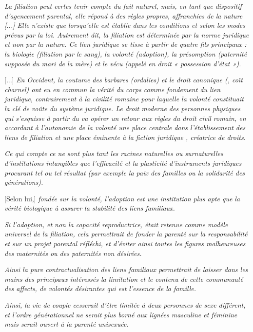 \begin{displayquote}

\emph{La filiation peut certes tenir compte du fait naturel, mais, en tant que dispositif d'agencement parental, elle répond à des règles propres, affranchies de la nature \emph{[...]} Elle n'existe que lorsqu'elle est établie dans les conditions et selon les modes prévus par la loi. Autrement dit, la filiation est déterminée par la norme juridique et non par la nature. Ce lien juridique se tisse à partir de quatre fils principaux : la biologie (filiation par le sang), la volonté (adoption), la présomption (paternité supposée du mari de la mère) et le vécu (appelé en droit « possession d'état »).}

[...] \emph{En Occident, la coutume des barbares (ordalies) et le droit canonique (, coït charnel) ont eu en commun la vérité du corps comme fondement du lien juridique, contrairement à la civilité romaine pour laquelle la volonté constituait la clé de voûte du système juridique. Le droit moderne des personnes physiques qui s'esquisse à partir du  va opérer un retour aux règles du droit civil romain, en accordant à l'autonomie de la volonté une place centrale dans l'établissement des liens de filiation et une place éminente à la fiction juridique , créatrice de droits.}
 
\emph{Ce qui compte ce ne sont plus tant les racines naturelles ou surnaturelles d'institutions intangibles que l'efficacité et la plasticité d'instruments juridiques procurant tel ou tel résultat (par exemple la paix des familles ou la solidarité des générations).}
 
 [Selon lui,] \emph{fondée sur la volonté, l'adoption est une institution plus apte que la vérité biologique à assurer la stabilité des liens familiaux.}
  
\emph{Si l'adoption, et non la capacité reproductrice, était retenue comme modèle universel de la filiation, cela permettrait de fonder la parenté sur la responsabilité et sur un projet parental réfléchi, et d'éviter ainsi toutes les figures malheureuses des maternités ou des paternités non désirées.}
 
\emph{Ainsi la pure contractualisation des liens familiaux permettrait de laisser dans les mains des principaux intéressés la limitation et le contenu de cette communauté des affects, de volontés désirantes qui est l'essence de la famille.}
 
\emph{Ainsi, la vie de couple cesserait d'être limitée à deux personnes de sexe différent, et l'ordre générationnel ne serait plus borné aux lignées masculine et féminine mais serait ouvert à la parenté unisexuée.}
 

\end{displayquote}
